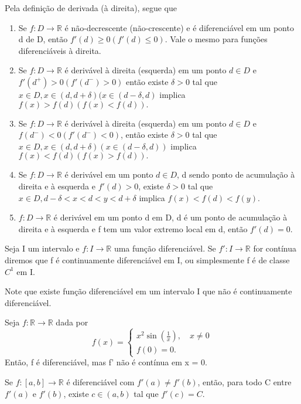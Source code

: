 \documentclass[Analysis/analysis_notes.tex]{subfiles}
\begin{document}
Pela defini\c cão de derivada (à direita), segue que
\begin{enumerate}
	\item Se \(f:D\rightarrow \mathbb{R}\) é não-decrescente (não-crescente) e é
	      diferenciável em um ponto d de D, então \(f'(d)\geq 0 (f'(d)\leq 0)\). Vale o mesmo
	      para fun\c cões diferenciáveis à direita.
	\item Se \(f:D\rightarrow \mathbb{R}\) é derivável à direita (esquerda) em um ponto
	      \(d\in D\) e \(f'(d^{+}) > 0 (f'(d^{-}) > 0)\) então existe \(\delta >0\) tal que
	      \(x\in D, x\in (d, d+\delta )(x\in (d-\delta , d)\) implica \(f(x) > f(d) (f(x) < f(d)).\)
	\item Se \(f:D\rightarrow \mathbb{R}\) é derivável à direita (esquerda) em um
	      ponto \(d\in D\) e \(f(d^{-}) < 0 (f'(d^{-}) < 0)\), então existe \(\delta >0\) tal que
	      \(x\in D, x\in(d, d+\delta )(x\in (d-\delta, d))\) implica \(f(x) < f(d) (f(x) > f(d)).\)
	\item Se \(f:D\rightarrow \mathbb{R}\) é derivável em um ponto \(d\in D\),
	      d sendo ponto de acumula\c cão à direita e à esquerda e \(f'(d) > 0\), existe \(\delta  > 0\)
	      tal que \(x\in D, d-\delta < x < d < y < d+\delta\) implica \(f(x) < f(d) < f(y).\)
	\item \(f:D\rightarrow \mathbb{R}\) é derivável em um ponto d em D, d é um ponto
	      de acumula\c cão à direita e à esquerda e f tem um valor extremo local em d, então \(f'(d) = 0.\)
\end{enumerate}
\begin{def*}
	Seja I um intervalo e \(f:I\rightarrow \mathbb{R}\) uma fun\c cão diferenciável.
	Se \(f':I\rightarrow \mathbb{R}\) for contínua diremos que f é continuamente diferenciável
	em I, ou simplesmente f é de classe \(C^{1}\) em I.
\end{def*}
Note que existe fun\c cão diferenciável em um intervalo I que não é
continuamente diferenciável.
\begin{example}
	Seja \(f:\mathbb{R}\rightarrow \mathbb{R}\) dada por
	\[
		f(x) = \left\{\begin{array}{ll}
			x^{2}\sin{(\frac{1}{x})},\quad x\neq0 \\
			f(0) = 0.
		\end{array}\right.
	\]
	Então, f é diferenciável, mas f' não é contínua em x = 0.
\end{example}
\hypertarget{darboux}{
	\begin{theorem*}
		Se \(f:[a, b]\rightarrow \mathbb{R}\) é diferenciável com \(f'(a)\neq f'(b)\), então,
		para todo C entre \(f'(a)\) e \(f'(b)\), existe \(c\in (a, b)\) tal que
		\(f'(c) = C\).
	\end{theorem*}}
\end{document}
